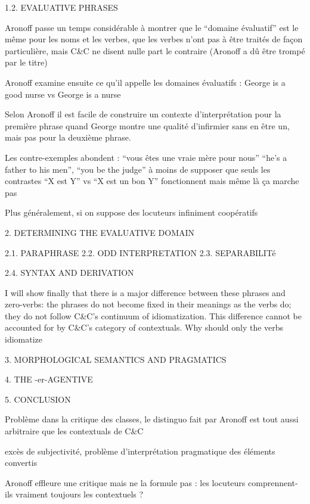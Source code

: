 \documentclass[a4paper,12pt]{article}
\begin{document}
 
 1.2. EVALUATIVE PHRASES
 
 
 Aronoff passe un temps considérable à montrer que le ``domaine évaluatif'' est le même pour les noms et les verbes, que les verbes n'ont pas 
 à être traités de façon particulière, mais C\&C ne disent nulle part le contraire (Aronoff a dû être trompé par le titre) 
 
   
Aronoff examine ensuite ce qu'il appelle les domaines évaluatifs : 
George is a good nurse vs George is a nurse

Selon Aronoff il est facile de construire un contexte d'interprétation pour la première phrase quand George montre une qualité d'infirmier sans en être
un, mais pas pour la deuxième phrase. 




Les contre-exemples abondent : 
``vous êtes une vraie mère pour nous'' ``he's a father to his men'', ``you be the judge'' 
à moins de supposer que seuls les contrastes ``X est Y'' vs ``X est un bon Y'' fonctionnent mais même là ça marche pas

Plus généralement, si on suppose des locuteurs infiniment coopératifs 
 
 2. DETERMINING THE EVALUATIVE DOMAIN
 
 2.1. PARAPHRASE
 2.2. ODD INTERPRETATION
 2.3. SEPARABILITé
 
 2.4. SYNTAX AND DERIVATION
 
 I will show finally that there is a major difference between these phrases
and zero-verbs: the phrases do not become fixed in their meanings as the verbs do;
they do not follow C\&C's continuum of idiomatization. This difference cannot be
accounted for by C\&C's category of contextuals. Why should only the verbs idiomatize

 3. MORPHOLOGICAL SEMANTICS AND PRAGMATICS
 
 4. THE -er-AGENTIVE
 
 5. CONCLUSION
  
 Problème dans la critique des classes, le distinguo fait par Aronoff est tout aussi arbitraire que les contextuals de C\&C 
 
 excès de subjectivité, problème d'interprétation pragmatique des éléments convertis
 
 Aronoff effleure une critique mais ne la formule pas : les locuteurs comprennent-ils vraiment toujours les contextuels ?
 
  
\end{document}
